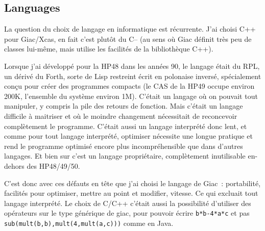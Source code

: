 \documentclass[a4paper,11pt]{article}
\begin{document}
\begin{giacjshere}
\subsection{Languages}
La question du choix de langage en informatique est r\'ecurrente.
J'ai choisi C++ pour Giac/Xcas, en fait c'est plut\^ot du C-- (au
sens o\`u Giac d\'efinit tr\`es peu de classes lui-m\^eme, mais
utilise les facilit\'es de la biblioth\`eque C++).

Lorsque j'ai d\'evelopp\'e pour la HP48 dans les ann\'ees 90, le langage
\'etait du RPL, un d\'eriv\'e du Forth, sorte de Lisp restreint \'ecrit
en polonaise invers\'e, sp\'ecialement con\c{c}u pour cr\'eer
des programmes compacts (le CAS de la HP49 occupe environ
200K, l'ensemble du syst\`eme environ 1M).
C'\'etait un langage o\`u on pouvait
tout manipuler, y compris la pile des retours de fonction.
Mais c'\'etait un langage difficile \`a maitriser et o\`u le
moindre changement n\'ecessitait de reconcevoir compl\`etement
le programme. C'\'etait aussi un langage interpr\'et\'e donc lent,
et comme pour tout langage interpr\'et\'e, optimiser n\'ecessite
une longue pratique et rend le programme optimis\'e encore plus
incompr\'ehensible que dans d'autres langages.
Et bien sur c'est un langage propri\'etaire, compl\`etement
inutilisable en-dehors des HP48/49/50.

C'est donc avec ces d\'efauts en t\^ete que j'ai choisi le
langage de Giac~: portabilit\'e, facilit\'es pour optimiser,
mettre au point et modifier, vitesse. Ce qui excluait
tout langage interpr\'et\'e. Le choix
de C/C++ c'\'etait aussi la possibilit\'e d'utiliser des op\'erateurs
sur le type g\'en\'erique de giac, pour pouvoir \'ecrire
\verb|b*b-4*a*c| et pas \verb|sub(mult(b,b),mult(4,mult(a,c)))|
comme en Java.


\end{giacjshere}
\end{document}
